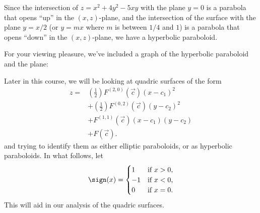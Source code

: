 \documentclass{ximera}
\begin{document}
\begin{example}
\begin{explanation}
\begin{image}
    \end{image}
    Since the intersection of $z=x^2+4y^2-5xy$ with the plane $y=0$ is
    a parabola that opens ``up'' in the $(x,z)$-plane, and the
    intersection of the surface with the plane $y = x/2$ (or $y=mx$
    where $m$ is between $1/4$ and $1$) is a parabola that opens
    ``down'' in the $(x,z)$-plane, we have a hyperbolic paraboloid.
    \begin{onlineOnly}
      For your viewing pleasure, we've included a graph of the
      hyperbolic paraboloid and the plane:
      \begin{center}    
      \end{center}
    \end{onlineOnly}
  \end{explanation}
\end{example}

Later in this course, we will be looking at quadric surfaces of the
form
\begin{align*}
  z = &\left(\frac{1}{2}\right)F^{(2,0)}(\vec{c})(x-c_1)^2\\
  &+ \left(\frac{1}{2}\right)F^{(0,2)}(\vec{c})(y-c_2)^2 \\
  &+ F^{(1,1)}(\vec{c}) (x-c_1)(y-c_2)\\
  &+ F(\vec{c}).
\end{align*}
and trying to identify them as either elliptic paraboloids, or as
hyperbolic paraboloids. In what follows, let
\[
\sign(x) =
\begin{cases}
  1  &\text{if $x>0$,}\\
  -1 &\text{if $x<0$,}\\
  0  &\text{if $x=0$.}
\end{cases}
\]
This will aid in our analysis of the quadric surfaces.
\end{document}
